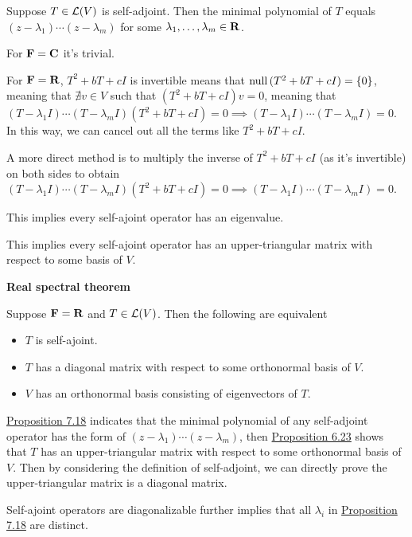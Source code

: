 \documentclass[12pt,a4paper]{article}
\begin{document}
    \begin{prop}\label{7.18}
        Suppose $T\in\mathcal{L}(V)$ is self-adjoint. Then the minimal polynomial of $T$ equals $(z-\lambda_1)\cdots(z-\lambda_m)$ for some $\lambda_1,\dots,\lambda_m\in\mathbf{R}$.
    \end{prop}
    \begin{remark}
        For $\mathbf{F}=\mathbf{C}$ it's trivial.
        
        For $\mathbf{F}=\mathbf{R}$, $T^2+bT+cI$ is invertible means that $\operatorname{null\,}(T^2+bT+cI)=\left\{0\right\}$, meaning that $\nexists v\in V$ such that $(T^2+bT+cI)v=0$, meaning that $(T-\lambda_1I)\cdots(T-\lambda_mI)(T^2+bT+cI)=0\implies(T-\lambda_1I)\cdots(T-\lambda_mI)=0$. In this way, we can cancel out all the terms like $T^2+bT+cI$.
    \end{remark}
    \begin{remark}
        A more direct method is to multiply the inverse of $T^2+bT+cI$ (as it's invertible) on both sides to obtain $(T-\lambda_1I)\cdots(T-\lambda_mI)(T^2+bT+cI)=0\implies(T-\lambda_1I)\cdots(T-\lambda_mI)=0$.
    \end{remark}
    \begin{remark}
        This implies every self-ajoint operator has an eigenvalue.
    \end{remark}
    \begin{remark}
        This implies every self-ajoint operator has an upper-triangular matrix with respect to some basis of $V$.
    \end{remark}
    \hfill

    \begin{thm}\label{7.19}
        \textbf{Real spectral theorem}

        Suppose $\mathbf{F}=\mathbf{R}$ and $T\in\mathcal{L}(V)$. Then the following are equivalent
        \begin{itemize}
            \item $T$ is self-ajoint.
            \item $T$ has a diagonal matrix with respect to some orthonormal basis of $V$.
            \item $V$ has an orthonormal basis consisting of eigenvectors of $T$.
        \end{itemize}
    \end{thm}
    \begin{remark}
        \hyperref[7.18]{Proposition 7.18} indicates that the minimal polynomial of any self-adjoint operator has the form of $(z-\lambda_1)\cdots(z-\lambda_m)$, then \hyperref[6.23]{Proposition 6.23} shows that $T$ has an upper-triangular matrix with respect to some orthonormal basis of $V$. Then by considering the definition of self-adjoint, we can directly prove the upper-triangular matrix is a diagonal matrix. 
    \end{remark}
    \begin{remark}
        Self-ajoint operators are diagonalizable further implies that all $\lambda_i$ in \hyperref[7.18]{Proposition 7.18} are distinct.
    \end{remark}
    \hfill
\end{document}

